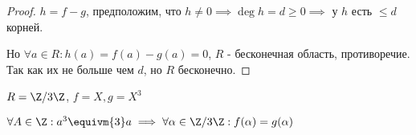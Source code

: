 \begin{proof}

    $h = f - g$, предположим, что $h \neq 0 \implies \deg h = d \geq 0 \implies$ у $h$ есть $\leq d$ корней.

    Но $\forall a \in R: h(a) = f(a) - g(a) = 0$, $R$ - бесконечная область, противоречие. Так как их не больше чем $d$, но $R$ бесконечно.
\end{proof}

\begin{example}
    $R = \Z/3\Z$, $f = X, g = X^3$

    $\forall A \in \Z: a^3 \equivm{3} a \implies \forall \alpha \in \Z/3\Z: f(\alpha) = g(\alpha)$
\end{example}
